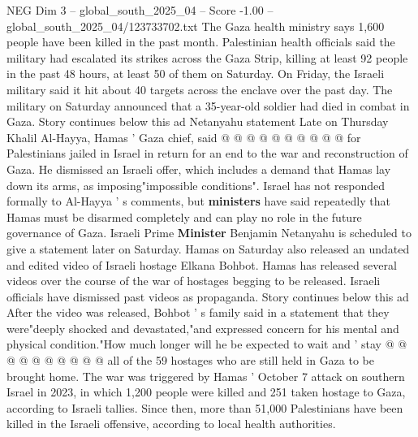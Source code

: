 \begin{textsample}{NEG Dim 3 – global\_south\_2025\_04 – Score -1.00 – global\_south\_2025\_04/123733702.txt}
The Gaza health ministry says 1,600 people have been killed in the past month.
Palestinian health officials said the military had escalated its strikes across the Gaza Strip, killing at least 92 people in the past 48 hours, at least 50 of them on Saturday.
On Friday, the Israeli military said it hit about 40 targets across the enclave over the past day.
The military on Saturday announced that a 35-year-old soldier had died in combat in Gaza.
Story continues below this ad Netanyahu statement Late on Thursday Khalil Al-Hayya, Hamas ' Gaza chief, said @ @ @ @ @ @ @ @ @ @ for Palestinians jailed in Israel in return for an end to the war and reconstruction of Gaza.
He dismissed an Israeli offer, which includes a demand that Hamas lay down its arms, as imposing"impossible conditions".
Israel has not responded formally to Al-Hayya ' s comments, but \textbf{ministers} have said repeatedly that Hamas must be disarmed completely and can play no role in the future governance of Gaza.
Israeli Prime \textbf{Minister} Benjamin Netanyahu is scheduled to give a statement later on Saturday.
Hamas on Saturday also released an undated and edited video of Israeli hostage Elkana Bohbot.
Hamas has released several videos over the course of the war of hostages begging to be released.
Israeli officials have dismissed past videos as propaganda.
Story continues below this ad After the video was released, Bohbot ' s family said in a statement that they were"deeply shocked and devastated,"and expressed concern for his mental and physical condition."How much longer will he be expected to wait and ' stay @ @ @ @ @ @ @ @ @ @ all of the 59 hostages who are still held in Gaza to be brought home.
The war was triggered by Hamas ' October 7 attack on southern Israel in 2023, in which 1,200 people were killed and 251 taken hostage to Gaza, according to Israeli tallies.
Since then, more than 51,000 Palestinians have been killed in the Israeli offensive, according to local health authorities.

\end{textsample}
